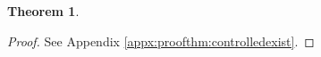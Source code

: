 \documentclass[11pt,print,draftcls,onecolumn,romanappendices]{ieeecolor}
\newtheorem{thm}{Theorem}
\newtheorem{rem}{Remark}
\newcommand{\Znn}[1]{\mathbb{Z}^{\geq0}_{#1}}
\newcommand{\kronI}[3]{{#1}_{#2}^{\otimes_{#3}}}
\newcommand{\revise}[1]{{\color{black} #1}}
\newcommand{\B}{\mathfrak{B}}
\newcommand{\F}{\mathcal{F}}
\begin{document}
{\begin{thm}
	
\end{thm}
}
\begin{proof}
	See Appendix \ref{appx:proofthm:controlledexist}.
\end{proof}

\end{document}

